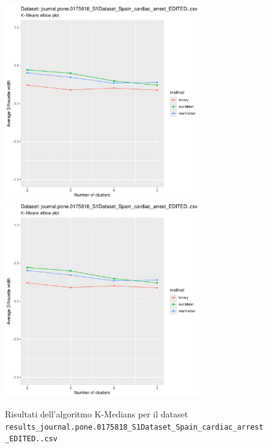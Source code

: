 \documentclass[12pt]{report}
\begin{document}
			\begin{figure}[h]
				\centering
				\includegraphics[width = 0.75\textwidth, height = 0.45\textheight, page = 3]{
					results/results_journal.pone.0175818_S1Dataset_Spain_cardiac_arrest_EDITED..csv.pdf
				}
				\includegraphics[width = 0.75\textwidth, height = 0.45\textheight, page = 4]{
					results/results_journal.pone.0175818_S1Dataset_Spain_cardiac_arrest_EDITED..csv.pdf
				}
				\caption{Risultati dell'algoritmo K-Medians per il dataset
				\texttt{results\_journal.pone.0175818\_S1Dataset\_Spain\_cardiac\_arrest\_EDITED..csv}}
				\label{fig:kmedians2}
			\end{figure}
\end{document}
